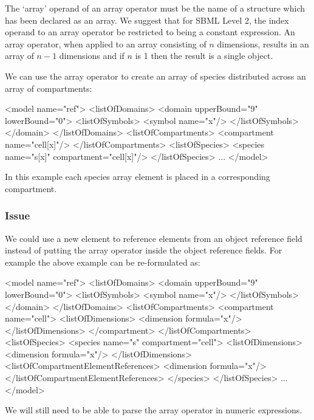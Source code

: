 \documentclass{cekarticle}
\begin{document}
The `array' operand of an array operator must be the name of a
structure which has been declared as an array.
We suggest that for SBML Level 2, the index operand to an array operator be
restricted to being a constant expression.  An array operator,
when applied to an array consisting of $n$ dimensions, results
in an array of $n-1$ dimensions and if $n$ is 1 then the result
is a single object.

We can use the array operator to create an array of species
distributed across an array of compartments:
\begin{example}
<model name="ref">
    <listOfDomains>
        <domain upperBound="9" lowerBound="0">
            <listOfSymbols>
                <symbol name="x"/>
            </listOfSymbols>
        </domain>
    </listOfDomains>
    <listOfCompartments>
        <compartment name="cell[x]"/>
    </listOfCompartments>
    <listOfSpecies>
        <species name="s[x]" compartment="cell[x]"/>
    </listOfSpecies>
    ...
</model>
\end{example}
In this example each species array element is placed in a
corresponding compartment.

\subsubsection{Issue}
We could use a new element to reference elements from an object
reference field instead of putting the array operator inside the
object reference fields. For example the above example can be
re-formulated as:
\begin{example}
<model name="ref">
    <listOfDomains>
        <domain upperBound="9" lowerBound="0">
            <listOfSymbols>
                <symbol name="x"/>
            </listOfSymbols>
        </domain>
    </listOfDomains>
    <listOfCompartments>
        <compartment name="cell">
            <listOfDimensions>
                <dimension formula="x"/>
            </listOfDimensions>
        </compartment>
    </listOfCompartments>
    <listOfSpecies>
        <species name="s" compartment="cell">
            <listOfDimensions>
                <dimension formula="x"/>
            </listOfDimensions>
            <listOfCompartmentElementReferences>
                <dimension formula="x"/>
            </listOfCompartmentElementReferences>
        </species>
    </listOfSpecies>
    ...
</model>

\end{example}
We will still need to be able to parse the array operator in
numeric expressions.
\end{document}
